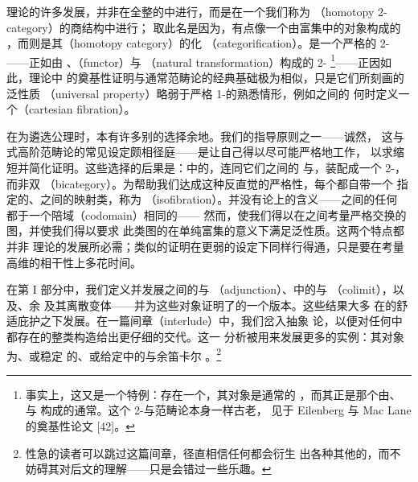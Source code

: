 \trInfinityCategory{}理论的许多发展，并非在全整的\trInfinityCosmos{}中进行，而是在一个我们称为
\textbf{\trHomotopyTwoCategory}（homotopy 2-category）的商结构中进行；
取此名是因为，\trInfinityCosmos{}有点像一个由富集\trModelCategory{}中的\trFibrant{}对象构成的%
\trCategory{}，而\trHomotopyTwoCategory{}则是其\trHomotopyCategory{}（homotopy category）的\trCategory{}化
（categorification）。\trHomotopyTwoCategory{}是一个严格的 2-\trCategory——正如由%
\trCategory{}、\textbf{\trFunctor}（functor）与
\textbf{\trNaturalTransformation}（natural transformation）构成的 2-\trCategory
\footnote{事实上，这又是一个特例：存在一个\trInfinityCosmos{}，其对象是通常的%
\trCategory{}，而其\trHomotopyTwoCategory{}正是那个由\trCategory{}、\trFunctor{}与%
\trNaturalTransformation{}构成的通常\trCategory{}。这个 2-\trCategory{}与范畴论本身一样古老，
见于 Eilenberg 与 Mac Lane 的奠基性论文 [42]。}——正因如此，\trInfinityCategory{}理论中
的奠基性证明与通常范畴论的经典基础极为相似，只是它们所刻画的泛性质
（universal property）略弱于严格 1-\trCategory{}的熟悉情形，例如\trInfinityCategory{}之间的\trFunctor
何时定义一个\textbf{\trCartesianFibration}（cartesian fibration）。

在为\trInfinityCosmos{}遴选公理时，本有许多别的选择余地。我们的指导原则之一——诚然，
这与\trHomotopy{}式高阶范畴论的常见设定颇相径庭——是让自己得以尽可能严格地工作，
以求缩短并简化证明。这些选择的后果是：\trInfinityCosmos{}中的\trInfinityCategory{}，连同它们之间的%
\trFunctor{}与\trNaturalTransformation{}，装配成一个 2-\trCategory{}，而非双\trCategory
（bicategory）。为帮助我们达成这种反直觉的严格性，每个\trInfinityCosmos{}都自带一个
指定的、\trInfinityCategory{}之间的映射类，称为\textbf{\trIsofibration}
（isofibration）。\trIsofibration{}并没有\trHomotopy{}论上的含义——\trInfinityCategory{}之间的任何%
\trFunctor{}都\trEquivalence{}于一个陪域（codomain）相同的\trIsofibration——
然而，\trIsofibration{}使我们得以在\trInfinityCategory{}之间考量严格交换的图，并使我们得以要求
此类图的\trLimit{}在单纯富集\trIsomorphism{}的意义下满足泛性质。这两个特点都并非%
\trInfinityCategory{}理论的发展所必需；类似的证明在更弱的设定下同样行得通，只是要在考量
高维\trCell{}的相干性上多花时间。

在第 I 部分中，我们定义并发展\trInfinityCategory{}之间的\trEquivalence{}与
\textbf{\trAdjunction}（adjunction）、\trInfinityCategory{}中的\trLimit{}与
\textbf{\trColimit}（colimit），以及\trCartesianFibration{}、余\trCartesianFibration
及其离散变体——并为这些对象证明了\trYonedaLemma{}的一个版本。这些结果大多
在\trHomotopyTwoCategory{}的舒适庇护之下发展。在一篇间章（interlude）中，我们岔入抽象%
\trInfinityCosmos{}论，以便对任何\trInfinityCosmos{}中都存在的整类\trLimit{}构造给出更仔细的交代。这一
分析被用来发展更多的\trInfinityCosmos{}实例：其对象为\trPointed\trInfinityCategory{}、或稳定
的\trInfinityCategory{}、或给定\trInfinityCosmos{}中的\trCartesianFibration{}与余笛卡尔%
\trFibration{}。\footnote{性急的读者可以跳过这篇间章，径直相信任何\trInfinityCosmos{}都会衍生
出各种其他的\trInfinityCosmos{}，而不妨碍其对后文的理解——只是会错过一些乐趣。}

